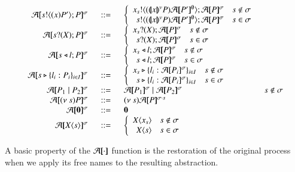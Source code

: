 \[
	\begin{array}{rcll}
		\absmap{\bout{s}{\abs{x} P'} P}{\sigma} &\bnfis&
		\left\{
		\begin{array}{rl}
			\bout{x_s}{\abs{\vmap{x}{P}} \absmap{P'}{\es}} \absmap{P}{\sigma} & s \notin \sigma\\
			\bout{s}{\abs{\vmap{x}{P}} \absmap{P'}{\es}} \absmap{P}{\sigma} & s \in \sigma
		\end{array}
		\right.
		\\
		\absmap{\binp{s}{X} P}{\sigma} &\bnfis&
		\left\{
		\begin{array}{rl}
			\binp{x_s}{X} \absmap{P}{\sigma} & s \notin \sigma\\
			\binp{s}{X} \absmap{P}{\sigma} & s \in \sigma
		\end{array}
		\right.
		\\
		\absmap{\bsel{s}{l} P}{\sigma} &\bnfis&
		\left\{
		\begin{array}{rl}
			\bsel{x_s}{l} \absmap{P}{\sigma} & s \notin \sigma\\
			\bsel{s}{l} \absmap{P}{\sigma} & s \in \sigma
		\end{array}
		\right.
		\\

		\absmap{\bbra{s}{l_i: P_i}_{i \in I}}{\sigma} &\bnfis&
		\left\{
		\begin{array}{rl}
			\bbra{x_s}{l_i: \absmap{P_i}{\sigma}}_{i \in I} & s \notin \sigma\\
			\bbra{s}{l_i: \absmap{P_i}{\sigma}}_{i \in I} & s \in \sigma\\
		\end{array}
		\right.
		\\

		\absmap{P_1 \Par P_2}{\sigma} &\bnfis& \absmap{P_1}{\sigma} \Par \absmap{P_2}{\sigma} & s \notin \sigma\\
		\absmap{\news{s} P}{\sigma} &\bnfis& \news{s} \absmap{P}{\sigma\cat s}\\
		\absmap{\inact}{\sigma} &\bnfis& \inact\\
		\absmap{\appl{\X}{s}}{\sigma} &\bnfis&
		\left\{
		\begin{array}{rl}
			\appl{\X}{x_s} & s \notin \sigma\\
			\appl{\X}{s} & s \in \sigma\\
		\end{array}
		\right.
	\end{array}
\]

A basic property of the $\mathcal{A}[\!\![\cdot]\!\!]$ function
is the restoration of the original process when we
apply its free names to the resulting abstraction.

